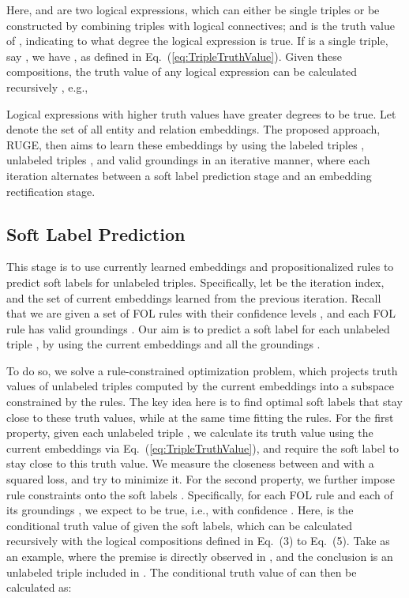 \documentclass[letterpaper]{article} \usepackage{aaai18}  \usepackage{times}  \usepackage{helvet}  \usepackage{courier}  \usepackage{url}  \usepackage{graphicx}  \usepackage{amsmath}
\begin{document}
Here,  and  are two logical expressions, which can either be single triples or be constructed by combining triples with logical connectives; and  is the truth value of , indicating to what degree the logical expression is true. If  is a single triple, say , we have , as defined in Eq.~(\ref{eq:TripleTruthValue}). Given these compositions, the truth value of any logical expression can be calculated recursively \cite{guo2016:KALE}, e.g.,

Logical expressions with higher truth values have greater degrees to be true. Let  denote the set of all entity and relation embeddings. The proposed approach, RUGE, then aims to learn these embeddings by using the labeled triples , unlabeled triples , and valid groundings  in an iterative manner, where each iteration alternates between a soft label prediction stage and an embedding rectification stage.

\subsection{Soft Label Prediction}
This stage is to use currently learned embeddings and propositionalized rules to predict soft labels for unlabeled triples. Specifically, let  be the iteration index, and  the set of current embeddings learned from the previous iteration. Recall that we are given a set of  FOL rules with their confidence levels , and each FOL rule  has  valid groundings . Our aim is to predict a soft label  for each unlabeled triple , by using the current embeddings  and all the groundings .

To do so, we solve a rule-constrained optimization problem, which projects truth values of unlabeled triples computed by the current embeddings into a subspace constrained by the rules. The key idea here is to find optimal soft labels that stay close to these truth values, while at the same time fitting the rules. For the first property, given each unlabeled triple , we calculate its truth value  using the current embeddings via Eq.~(\ref{eq:TripleTruthValue}), and require the soft label  to stay close to this truth value. We measure the closeness between  and  with a squared loss, and try to minimize it. For the second property, we further impose rule constraints onto the soft labels . Specifically, for each FOL rule  and each of its groundings , we expect  to be true, i.e.,  with confidence . Here,  is the conditional truth value of  given the soft labels, which can be calculated recursively with the logical compositions defined in Eq.~(3) to Eq.~(5). Take  as an example, where the premise  is directly observed in , and the conclusion  is an unlabeled triple included in . The conditional truth value of  can then be calculated as:
\end{document}

